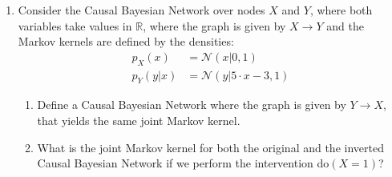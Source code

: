 \begin{enumerate}[label=6.\arabic*]
    \begin{gradedsolution}
        We have
        \begin{align*}
            \mat{X \\ Y} \sim \mathcal{N}\left( \mat{\mu_1\\ a\cdot\mu_1 + \mu_2}, \Sigma\right) \quad \text{with} \quad \Sigma := \mat{\sigma_1^2 & a\sigma_1^2 \\ a \sigma_1^2 & a^2 \sigma_1^2 + \sigma_2^2}
        \end{align*}
        and
        \begin{align*}
            P(Z|X, Y) & = \mathcal{N}\left(A\mat{X \\Y} + \mu_3, \sigma^2_3\right)
        \end{align*}
        where $A = \mat{c, b}$, and so
        \begin{align*}
            \mat{X \\ Y \\ Z} \sim \mathcal{N}\left(\mat{\mu_1\\ a\mu_1+\mu_2 \\ b(a\mu_1 + \mu_2) + c\mu_1 + \mu_3}, \mat{\Sigma & \Sigma A^\top \\ A\Sigma & \sigma_3^2 + A\Sigma A^\top}\right),
        \end{align*}
        Then we see that $\textrm{Cov}(X, Z) = (A\Sigma)_1 = (ab+c)\sigma_1^2 = 0$ whenever $ab+c=0$, so for these parameters we have $X\Indep Z$. Since $X$ is not d-separated from $Z$ in $G$, this is a faithfulness violation.

        An alternative solution is $\Cov(Y, Z) = 0 \iff b(a^2\sigma_1^2 + \sigma_2^2) + ac\sigma_1^2 = 0$, which holds if for example $a=c=1, b=-\sigma_1^2/(\sigma_1^2+\sigma_2^2)$.
    \end{gradedsolution}

    \item %
    Consider the Causal Bayesian Network over nodes $X$ and $Y$, where both variables take values in $\mathbb{R}$, where the graph is given by $X \rightarrow Y$ and the Markov kernels are defined by the densities:
    \begin{align*}
        p_X(x)   & = \mathcal{N}(x|0,1)            \\
        p_Y(y|x) & = \mathcal{N}(y|5\cdot x -3, 1)
    \end{align*}
    \begin{enumerate}
        \item Define a Causal Bayesian Network where the graph is given by $Y \rightarrow X$, that yields the same joint Markov kernel.
        \item What is the joint Markov kernel for both the original and the inverted Causal Bayesian Network if we perform the intervention do$(X=1)$?
    \end{enumerate}


\end{enumerate}
